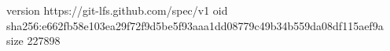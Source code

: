 version https://git-lfs.github.com/spec/v1
oid sha256:e662fb58e103ea29f72f9d5be5f93aaa1dd08779c49b34b559da08df115aef9a
size 227898
